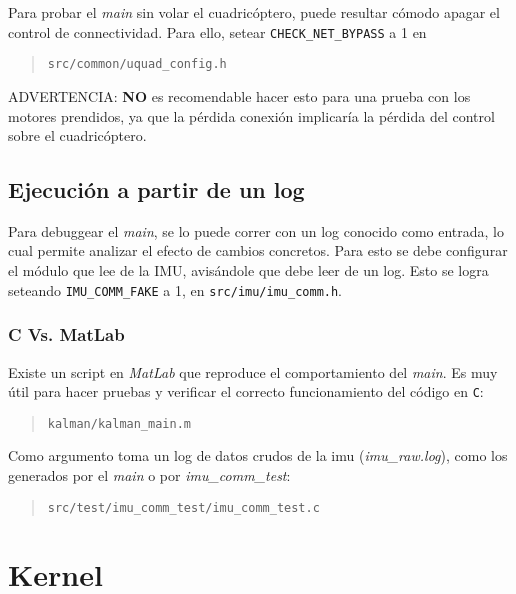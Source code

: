 \documentclass[main]{subfiles}
\begin{document}
Para probar el \textit{main} sin volar el cuadricóptero, puede resultar cómodo apagar el control de connectividad. Para ello, setear \verb+CHECK_NET_BYPASS+ a 1 en
\begin{quote}
\begin{verbatim}
src/common/uquad_config.h
\end{verbatim}
\end{quote}

ADVERTENCIA: \textbf{NO} es recomendable hacer esto para una prueba con los motores prendidos, ya que la pérdida conexión implicaría la pérdida del control sobre el cuadricóptero.

\subsection{Ejecución a partir de un log}
\label{sec:codigo:ejecucion-a-partir-de-un-log}

Para debuggear el \textit{main}, se lo puede correr con un log conocido como entrada, lo cual permite analizar el efecto de cambios concretos. Para esto se debe configurar el módulo que lee de la IMU, avisándole que debe leer de un log. Esto se logra seteando \verb+IMU_COMM_FAKE+ a 1, en \verb+src/imu/imu_comm.h+.

\subsubsection{C Vs. MatLab}
\label{sec:codigo:c-vs-matlab}

Existe un script en \textit{MatLab} que reproduce el comportamiento del \textit{main}. Es muy útil para hacer pruebas y verificar el correcto funcionamiento del código en \verb+C+:

\begin{quote}
\begin{verbatim}
kalman/kalman_main.m
\end{verbatim}
\end{quote}

Como argumento toma un log de datos crudos de la imu (\textit{imu\_raw.log}), como los generados por el \textit{main} o por \textit{imu\_comm\_test}:
\begin{quote}
\begin{verbatim}
src/test/imu_comm_test/imu_comm_test.c
\end{verbatim}
\end{quote}

\section{Kernel}
\label{sec:codigo:kernel}
\end{document}
